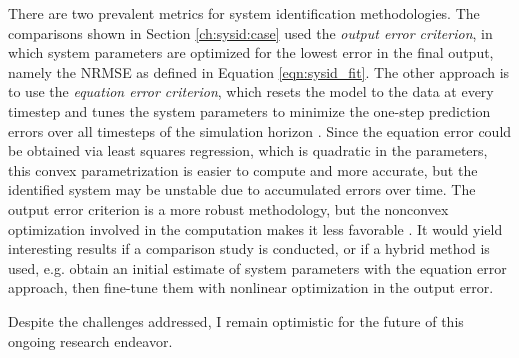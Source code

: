 There are two prevalent metrics for system identification methodologies. The comparisons shown in Section \ref{ch:sysid:case} used the \emph{output error criterion}, in which system parameters are optimized for the lowest error in the final output, namely the NRMSE as defined in Equation \eqref{eqn:sysid_fit}. The other approach is to use the \emph{equation error criterion}, which resets the model to the data at every timestep and tunes the system parameters to minimize the one-step prediction errors over all timesteps of the simulation horizon \cite{equation_output_error, ljung1999system}. Since the equation error could be obtained via least squares regression, which is quadratic in the parameters, this convex parametrization is easier to compute and more accurate, but the identified system may be unstable due to accumulated errors over time. The output error criterion is a more robust methodology, but the nonconvex optimization involved in the computation makes it less favorable \cite{tedrake_manipulation_lec_error}. It would yield interesting results if a comparison study is conducted, or if a hybrid method is used, e.g. obtain an initial estimate of system parameters with the equation error approach, then fine-tune them with nonlinear optimization in the output error. 

Despite the challenges addressed, I remain optimistic for the future of this ongoing research endeavor. 
